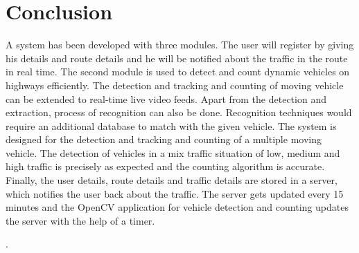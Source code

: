 \chapter{Conclusion}
\par A system has been developed with three modules. The user will register by giving his details and route details and he will be notified about the traffic in the route in real time. The second module is used to detect and count dynamic vehicles on highways efficiently. The detection and tracking and counting of moving vehicle can be extended to real-time live video feeds. Apart from the detection and extraction, process of recognition can also be done. Recognition techniques would require an additional database to match with the given vehicle. The system is designed for the detection and tracking and counting of a multiple moving vehicle. The detection of vehicles in a mix traffic situation of low, medium and high traffic is precisely as expected and the counting algorithm is accurate. Finally, the user details, route details and traffic details are stored in a server, which notifies the user back about the traffic. The server gets updated every 15 minutes and the OpenCV application for vehicle detection and counting updates the server with the help of a timer. 


.
